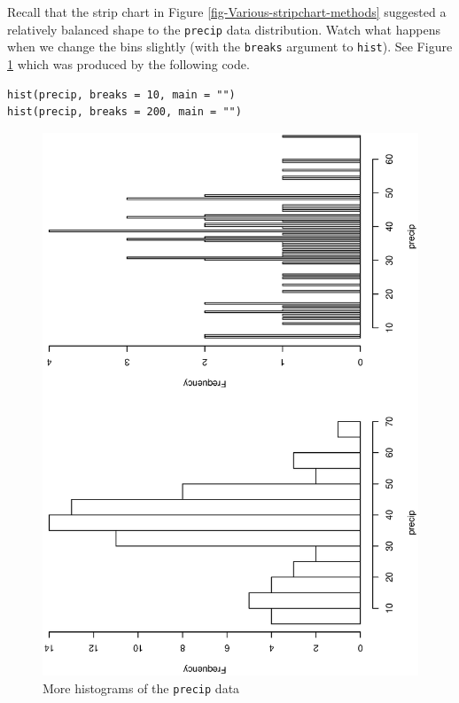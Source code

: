 \documentclass[captions=tableheading]{scrbook}
\begin{document}
\begin{example}
Recall that the strip chart in Figure \ref{fig-Various-stripchart-methods} suggested a relatively balanced shape to the \texttt{precip} data distribution. Watch what happens when we change the bins slightly (with the \texttt{breaks} argument to \texttt{hist}). See Figure \ref{fig-histograms-bins} which was produced by the following code.



\lstset{language=R}
\begin{lstlisting}
hist(precip, breaks = 10, main = "")
hist(precip, breaks = 200, main = "")
\end{lstlisting}







\begin{figure}[th]
  \includegraphics[angle=270, totalheight=4in]{ps/datadesc/histograms-bins.ps}
  \caption{More histograms of the \texttt{precip} data}
  \label{fig-histograms-bins}
\end{figure}



\end{example}
\end{document}
